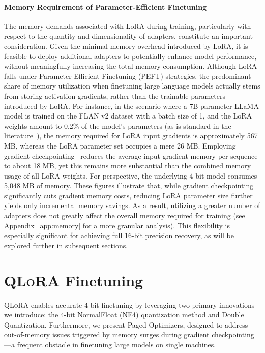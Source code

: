 \paragraph{Memory Requirement of Parameter-Efficient Finetuning} The memory demands associated with LoRA during training, particularly with respect to the quantity and dimensionality of adapters, constitute an important consideration. Given the minimal memory overhead introduced by LoRA, it is feasible to deploy additional adapters to potentially enhance model performance, without meaningfully increasing the total memory consumption. Although LoRA falls under Parameter Efficient Finetuning (PEFT) strategies, the predominant share of memory utilization when finetuning large language models actually stems from storing activation gradients, rather than the trainable parameters introduced by LoRA. For instance, in the scenario where a 7B parameter LLaMA model is trained on the FLAN v2 dataset with a batch size of 1, and the LoRA weights amount to 0.2\% of the model’s parameters (as is standard in the literature~\citep{hu2021lora,liu2022few}), the memory required for LoRA input gradients is approximately 567 MB, whereas the LoRA parameter set occupies a mere 26 MB. Employing gradient checkpointing~\citep{chen2016training} reduces the average input gradient memory per sequence to about 18 MB, yet this remains more substantial than the combined memory usage of all LoRA weights. For perspective, the underlying 4-bit model consumes 5,048 MB of memory. These figures illustrate that, while gradient checkpointing significantly cuts gradient memory costs, reducing LoRA parameter size further yields only incremental memory savings. As a result, utilizing a greater number of adapters does not greatly affect the overall memory required for training (see Appendix~\ref{app:memory} for a more granular analysis). This flexibility is especially significant for achieving full 16-bit precision recovery, as will be explored further in subsequent sections.

\section{\textsc{QLoRA} Finetuning}

\textsc{QLoRA} enables accurate 4-bit finetuning by leveraging two primary innovations we introduce: the 4-bit NormalFloat (NF4) quantization method and Double Quantization. Furthermore, we present Paged Optimizers, designed to address out-of-memory issues triggered by memory surges during gradient checkpointing—a frequent obstacle in finetuning large models on single machines.

